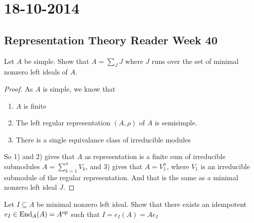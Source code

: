 \section{18-10-2014}
\subsection{Representation Theory Reader Week 40}

\begin{prop}
Let \(A\) be simple. Show that \(A=\sum _J J\) where \(J\) runs over the set of minimal nonzero left ideals of \(A\).
\end{prop}

\begin{proof}
As \(A\) is simple, we know that

\begin{enumerate}
  \item \(A\) is finite
  \item The left regular representation \((A,\rho )\) of \(A\) is semisimple.
  \item There is a single equivalance class of irreducible modules
\end{enumerate}

So 1) and 2) gives that \(A\) as representation is a finite sum of irreducible submodules \(A=\sum _{k=1}^nV_{k}\), and 3) gives that \(A=V_{1}^n\), where \(V_{1}\) is an irreducible submodule of the regular representation. And that is the same as a minimal nonzero left ideal \(J\).
\end{proof}

\begin{prop}
Let \(I\subseteq A\) be minimal nonzero left ideal. Show that there exists an idempotent \(e_I\in \operatorname{End}_A(A)=A^{\operatorname{op}}\) such that \(I=e_I(A)=Ae_I\)
\end{prop}


